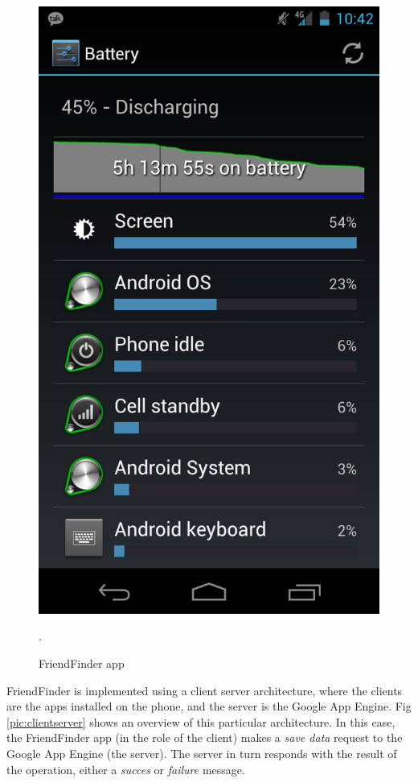 \begin{figure}[h]
	\begin{center}
		\includegraphics[scale=0.2]{figures/galaxy-nexus-battery.png}
	\end{center}
	
	\caption{FriendFinder app}.
	\label{pic:ff_prtscr}

\end{figure} 

FriendFinder is implemented using a client server architecture, where the clients are the apps installed on the phone, and the server is the Google App Engine. Fig \ref{pic:clientserver} shows an overview of this particular architecture. In this case, the FriendFinder app (in the role of the client) makes a \textit{save data} request to the Google App Engine (the server). The server in turn responds with the result of the operation, either a \textit{succes} or \textit{failure} message.  

